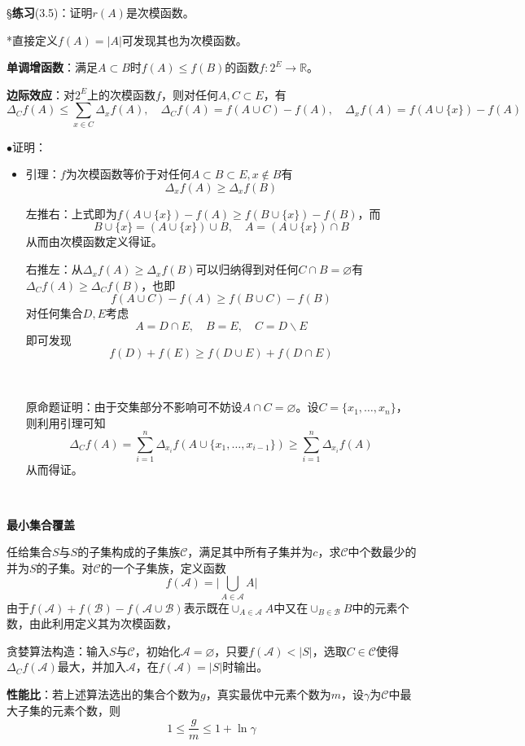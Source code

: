 \documentclass[a4paper,UTF8,fontset=windows]{ctexart}
\newcommand{\exce}[2]{\S\textbf{练习}(#1)：{\kaishu #2}}
\newcommand{\proo}[1]{{\kaishu $\bullet$证明：
\begin{itemize}
    \item[] #1
\end{itemize}
}}
\begin{document}
\exce{3.5}{证明$r(A)$是次模函数。}

*直接定义$f(A)=|A|$可发现其也为次模函数。

\textbf{单调增函数}：满足$A\subset B$时$f(A)\le f(B)$的函数$f:2^E\to\mathbb{R}$。

\textbf{边际效应}：对$2^E$上的次模函数$f$，则对任何$A,C\subset E$，有
$$\Delta_Cf(A)\le\sum_{x\in C}\Delta_xf(A),\quad \Delta_Cf(A)=f(A\cup C)-f(A),\quad\Delta_xf(A)=f(A\cup\{x\})-f(A)$$

\proo{
    引理：$f$为次模函数等价于对任何$A\subset B\subset E,x\notin B$有
    $$\Delta_xf(A)\ge\Delta_xf(B)$$

    左推右：上式即为$f(A\cup\{x\})-f(A)\ge f(B\cup\{x\})-f(B)$，而
    $$B\cup\{x\}=(A\cup\{x\})\cup B,\quad A=(A\cup\{x\})\cap B$$
    从而由次模函数定义得证。

    右推左：从$\Delta_xf(A)\ge\Delta_xf(B)$可以归纳得到对任何$C\cap B=\varnothing$有$\Delta_Cf(A)\ge\Delta_Cf(B)$，也即
    $$f(A\cup C)-f(A)\ge f(B\cup C)-f(B)$$
    对任何集合$D,E$考虑
    $$A=D\cap E,\quad B=E,\quad C=D\backslash E$$
    即可发现
    $$f(D)+f(E)\ge f(D\cup E)+f(D\cap E)$$

    \

    原命题证明：由于交集部分不影响可不妨设$A\cap C=\varnothing$。设$C=\{x_1,\dots,x_n\}$，则利用引理可知
    $$\Delta_Cf(A)=\sum_{i=1}^n\Delta_{x_i}f(A\cup\{x_1,\dots,x_{i-1}\})\ge\sum_{i=1}^n\Delta_{x_i}f(A)$$
    从而得证。

}

\

\textbf{最小集合覆盖}

任给集合$S$与$S$的子集构成的子集族$\mathcal{C}$，满足其中所有子集并为$c$，求$\mathcal{C}$中个数最少的并为$S$的子集。对$\mathcal{C}$的一个子集族，定义函数
$$f(\mathcal{A})=\bigg|\bigcup_{A\in\mathcal{A}}A\bigg|$$
由于$f(\mathcal{A})+f(\mathcal{B})-f(\mathcal{A}\cup\mathcal{B})$表示既在$\cup_{A\in\mathcal{A}}A$中又在$\cup_{B\in\mathcal{B}}B$中的元素个数，由此利用定义其为次模函数，

贪婪算法构造：输入$S$与$\mathcal{C}$，初始化$\mathcal{A}=\varnothing$，只要$f(\mathcal{A})<|S|$，选取$C\in\mathcal{C}$使得$\Delta_Cf(\mathcal{A})$最大，并加入$\mathcal{A}$，在$f(\mathcal{A})=|S|$时输出。

\textbf{性能比}：若上述算法选出的集合个数为$g$，真实最优中元素个数为$m$，设$\gamma$为$\mathcal{C}$中最大子集的元素个数，则
$$1\le\frac{g}{m}\le 1+\ln\gamma$$
\end{document}
